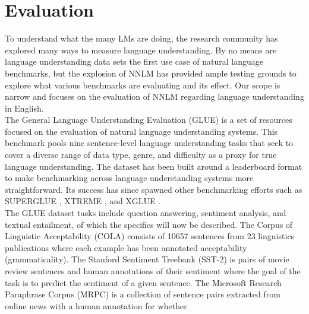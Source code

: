 \section{Evaluation}
\label{chap:prior:sec:eval}
To understand what the many LMs are doing, the research community has explored many ways to measure language understanding. By no means are language understanding data sets the first use case of natural language benchmarks, but the explosion of NNLM has provided ample testing grounds to explore what various benchmarks are evaluating and its effect. Our scope is narrow and focuses on the evaluation of NNLM regarding language understanding in English. \\
The General Language Understanding Evaluation (GLUE) \cite{Wang2018GLUEAM} is a set of resources focused on the evaluation of natural language understanding systems. This benchmark pools nine sentence-level language understanding tasks that seek to cover a diverse range of data type, genre, and difficulty as a proxy for true language understanding. The dataset has been built around a leaderboard format to make benchmarking across language understanding systems more straightforward. Its success has since spawned other benchmarking efforts such as SUPERGLUE \cite{Wang2019SuperGLUEAS}, XTREME \cite{Hu2020XTREMEAM}, and XGLUE \cite{Liang2020XGLUEAN}. \\
The GLUE dataset tasks include question answering, sentiment analysis, and textual entailment, of which the specifics will now be described. The Corpus of Linguistic Acceptability (COLA) \cite{Warstadt2019NeuralNA} consists of 10657 sentences from 23 linguistics publications where each example has been annotated acceptability (grammaticality). The Stanford Sentiment Treebank (SST-2) \cite{Socher2013RecursiveDM} is pairs of movie review sentences and human annotations of their sentiment where the goal of the task is to predict the sentiment of a given
sentence. The Microsoft Research Paraphrase Corpus (MRPC) \cite{Dolan2005AutomaticallyCA} is a collection of sentence pairs extracted from online news with a human annotation for whether
